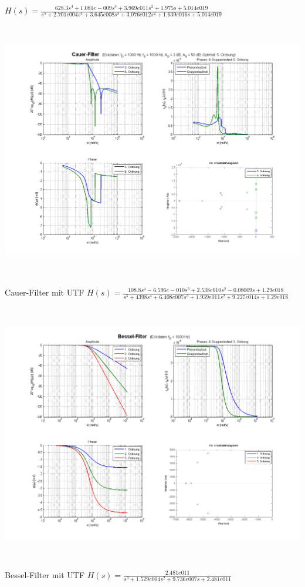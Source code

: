 \begin{center}
$H(s) = \frac{628.3 s^4 + 1.081e-009 s^3 + 3.969e011 s^2 + 1.975 s +
5.014e019}{s^5 + 2.701e004 s^4 + 3.645e008 s^3 + 3.076e012 s^2 + 1.639e016 s + 5.014e019}$
\includegraphics[height=12cm]{./bilder/filter-cauer.png} \\Cauer-Filter mit UTF
$H(s) = \frac{108.8 s^4 - 6.596e-010 s^3 + 2.538e010 s^2 - 0.08009 s + 1.29e018}{s^5 + 4398 s^4 + 6.408e007 s^3 + 1.939e011 s^2 + 9.227e014 s + 1.29e018}$
\includegraphics[height=12cm]{./bilder/filter-bessel.png} \\Bessel-Filter mit UTF $H(s) =
 \frac{2.481e011}{s^3 + 1.529e004 s^2 + 9.736e007 s + 2.481e011}$
\end{center}


